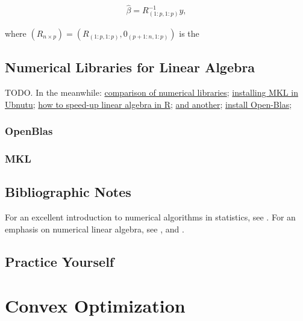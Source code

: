 \documentclass[]{book}
\theoremstyle{definition}
\theoremstyle{definition}
\theoremstyle{definition}
\theoremstyle{remark}
\begin{document}
\begin{align*}
  \hat \beta = R_{(1:p,1:p)}^{-1} y,
\end{align*}

where \((R_{n\times p})=(R_{(1:p,1:p)},0_{(p+1:n,1:p)})\) is the

\section{Numerical Libraries for Linear
Algebra}\label{numerical-libraries-for-linear-algebra}

TODO. In the meanwhile:
\href{https://en.wikipedia.org/wiki/Comparison_of_linear_algebra_libraries}{comparison
of numerical libraries};
\href{http://dirk.eddelbuettel.com/blog/2018/04/15/\#018_mkl_for_debian_ubuntu}{installing
MKL in Ubnutu};
\href{https://www.r-bloggers.com/why-is-r-slow-some-explanations-and-mklopenblas-setup-to-try-to-fix-this/}{how
to speed-up linear algebra in R};
\href{https://www.r-bloggers.com/for-faster-r-use-openblas-instead-better-than-atlas-trivial-to-switch-to-on-ubuntu/}{and
another};
\href{https://gist.github.com/pachamaltese/e4b819ccf537d465a8d49e6d60252d89}{install
Open-Blas};

\subsection{OpenBlas}\label{openblas}

\subsection{MKL}\label{mkl}

\section{Bibliographic Notes}\label{bibliographic-notes-14}

For an excellent introduction to numerical algorithms in statistics, see
\citet{weihs2013foundations}. For an emphasis on numerical linear
algebra, see \citet{gentle2012numerical}, and \citet{golub2012matrix}.

\section{Practice Yourself}\label{practice-yourself-13}

\chapter{Convex Optimization}\label{convex}
\end{document}
